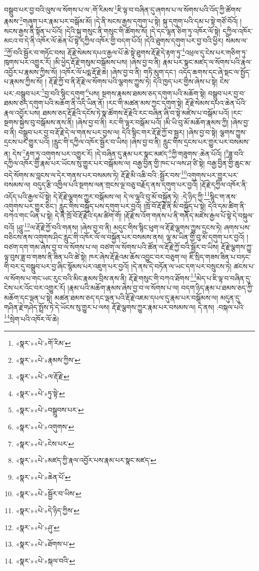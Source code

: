བསྒྲུབ་པར་བྱ་བའི་ལུས་ལ་སོགས་པ་ལ་:གོ་རིམས་\footnote{«སྣར་»«པེ་»གོ་རིམ་}ཇི་ལྟ་བ་བཞིན་དུ་ཞགས་པ་ལ་སོགས་པའི་འོད་ཀྱི་ཚོགས་རྣམས་\footnote{«སྣར་»«པེ་»རྣམས་ཀྱིས་}གཞུག་པར་རྣམ་པར་བསྒོམ་མོ། །དེ་ནི་སངས་རྒྱས་དགུག་པ་སྟེ། སྐུ་དགུག་པའི་དམ་པ་སྟེ་གཙོ་བོའོ། །སངས་རྒྱས་ནི་སྟོན་པ་པོའོ། །དེའི་སྐུ་གསུང་ནི་གསུང་གི་ཚོགས་སོ། །དེ་དང་ལྷན་ཅིག་ཏུ་འཁོར་ལོ་སྟེ། དཀྱིལ་འཁོར་མངའ་བ་དེ་ནི་འཁོར་ལོ་ཆེན་པོ་སྟེ་དཀྱིལ་འཁོར་གྱི་བདག་པོའོ། །དེའི་ཐུགས་དགུག་པར་བྱ་བའི་ཕྱིར། སེམས་ལ་\footnote{«སྣར་»«པེ་»ལ་རྡོ་རྗེ་}ཀྱོ་བའི་སྦྱོར་བ་གཏོང་བས། རྡོ་རྗེ་སེམས་དཔའ་རྒྱལ་པོ་ཆེ་སྟེ་ཐུགས་རྡོ་རྗེ་དེ་རྟག་ཏུ་\footnote{«སྣར་»«པེ་»ཏུ་སྟེ་}འཕྲལ་དུ་ངེས་པར་གཅིག་ཏུ་ཁུགས་པར་འགྱུར་རོ། །མི་ཕྱེད་རྡོ་རྗེ་གསུམ་བསྒོམས་པས། །ཞེས་བྱ་བ་ནི། རྣམ་པར་སྣང་མཛད་ལ་སོགས་པའི་རྣལ་འབྱོར་པ་རྣམས་ཀྱིས་སོ། །འཁོར་ལོ་པདྨ་རྡོ་རྗེ་ཆེ། །ཞེས་བྱ་བ་ནི། གཏི་མུག་དང་། འདོད་ཆགས་དང་ཞེ་སྡང་ལ་སྤྱོད་པ་རྣམས་ཀྱིས་སོ། །
རྡོ་རྗེ་ཀྱོ་བ་ནི་རྡོ་རྗེ་ལ་སོགས་པའི་ལྕགས་ཀྱུས་ཏེ། དེའི་ཁྱད་པར་གྱིས་ཞེས་པ་སྟེ། ངེས་པར་:བསྒྲུབ་པར་\footnote{«སྣར་»«པེ་»བསྒྲུབས་པར་}བྱ་བའི་སྙིང་དགུག་\footnote{«སྣར་»«པེ་»འགུགས་}པས། སྔགས་རྣམས་ཐམས་ཅད་དགུག་པའི་མཆོག་སྟེ། བསྒྲུབ་པར་བྱ་བ་ཐམས་ཅད་དགུག་པའི་མཆོག་ནི་འདི་ཡིན་ནོ། །རང་གི་མཚན་མས་ཀྱང་དགུག་སྟེ། རྡོ་རྗེ་སེམས་དཔའ་ཆེན་པོའི་རྣལ་འབྱོར་པས། ཐམས་ཅད་རྡོ་རྗེའི་དངོས་ཏེ་སྣ་ཚོགས་རྡོ་རྗེའི་རང་བཞིན་ཞི་བ་སྟེ་མཛེས་པ་བསྒོམ་པའོ། །རང་སྔགས་སྐྱེས་བུ་བསྒོམས་ནས་ནི། །ཞེས་བྱ་བ་ནི། རང་གི་ལྷར་བསྒོམ་པའོ། །མི་ཡི་བུ་མོ་མཆོག་རྣམས་ཀྱི། །ཞེས་བྱ་བ་ནི། བསྒྲུབ་པར་བྱ་བ་རྡོ་རྗེ་དེ་ལ་གནས་པར་བྱས་ལ། དེའི་སྙིང་གར་རྡོ་རྗེ་ཀྱོ་བ་སྦྱར། །ཞེས་བྱ་བ་སྟེ། ལྕགས་ཀྱུས་དྲངས་པར་གྱུར་པའོ། །རླུང་གི་དཀྱིལ་འཁོར་སྦྱོར་བ་ཡིས། །ཞེས་བྱ་བ་ནི། རླུང་གིས་དྲངས་པར་གྱུར་པར་བསམས་ན། དེས་\footnote{«སྣར་»«པེ་»ངེས་པར་}རྟག་ཏུ་འགུགས་པར་འགྱུར་རོ། །དེ་བཞིན་དུ་རྣམ་པར་སྣང་མཛད་\footnote{«སྣར་»«པེ་»མཛད་ཀྱི་རྣལ་འབྱོར་པས་རྣམ་པར་སྣང་མཛད་}ཀྱི་གཟུགས་:ཆེན་པོའོ། །\footnote{«སྣར་»«པེ་»ཆེན་པོ་}ཟླ་བའི་དཀྱིལ་འཁོར་གྱི་རྣམ་པར་ཡོངས་སུ་གྱུར་པར་བསྒོམས་ལ། བརྒྱ་བྱིན་གྱི་ཁང་པ་ལས་ཤ་ཙི་སྟེ། བརྒྱ་བྱིན་གྱི་ཆུང་མ་བདེ་སོགས་མ་བླངས་ལ་དེར་གནས་པར་བསམས་ཏེ། རྡོ་རྗེ་མི་འཆི་བའི་:སྦྱོར་བས་\footnote{«སྣར་»«པེ་»སྦྱོར་བ་ཡིས་}འགུགས་པར་གྱུར་པར་བསམས་ལ། བདུད་རྩི་འཁྱིལ་པའི་སྔགས་ལན་གྲངས་ལྔ་བཅུ་བརྗོད་ནས་དགུག་པར་བྱའོ། །རྡོ་རྗེ་དཀྱིལ་འཁོར་ནི་འདོད་པའི་རྒྱལ་པོ་སྟེ། དེ་རྡོ་རྗེ་ལྕགས་ཀྱུར་བསྒོམས་ལ། དེ་ལ་ལྷའི་བུ་མོ་བསྐྱོན་ཏེ། :དེ་ཉིད་ཀྱི་\footnote{«སྣར་»«པེ་»དེ་ཉིད་ཀྱིས་}སྙིང་ག་ནས་འགུགས་པར་གྱུར་ཅིང་། རླུང་གིས་བསྐྱོད་པས་དགུག་པར་བྱའོ། །ཁྲོ་བོ་རྡོ་རྗེ་ནི་མི་བསྐྱོད་པ་སྟེ། དེའི་དམ་ཚིག་ནི་བཀའ་གང་ཡིན་པ་སྟེ། དེ་ནི་ཁྲོ་བོ་རྡོ་རྗེའི་དམ་ཚིག་གོ། །རྡོ་རྗེ་ས་འོག་གནས་པ་ནི་གནོད་མཛེས་རྒྱལ་པོ་སྟེ་དེ་བསྐུལ་བའོ། །ཤཱུ་\footnote{«སྣར་»«པེ་»ཤུ་}ལ་རྡོ་རྗེ་ཀྱོ་བའི་གནས། །ཞེས་བྱ་བ་ནི། མདུང་གིས་སྙིང་ཕུག་ལ་རྡོ་རྗེ་ལྕགས་ཀྱུས་དྲངས་ཏེ། ཞགས་པས་བཅིངས་ནས་འགུགས་ཤིང་རླུང་གི་འཁོར་ལོ་ལ་བསྐྱོན་པར་བསམས་ནས། ལྷ་མ་ཡིན་གྱི་བུ་མོ་དགུག་པར་བྱའོ། །བཙག་དག་གམ་ཞེས་བྱ་བ་ལ་སོགས་པ་ལ། བཙག་ལ་སོགས་པའི་ཚོན་ལ་རྡོ་རྗེ་ཀྱོ་བའི་སྦྱོར་བ་ཡིས། རྡོ་རྗེ་ལྕགས་ཀྱུ་ལྟ་བུས་ཟླ་བ་གཟས་ནི་ཟིན་པའི་ཚེ་སྟེ། ཁར་ཞེས་རྡོ་རྗེའམ་ཆོས་འབྱུང་བར་བཅུག་ལ། ཇི་སྲིད་གཟས་ཟིན་པ་བཏང་གི་བར་དུ་བསྒྲུབ་པར་བྱ་ཞིང་སྙོམས་པར་འཇུག་པར་བྱའོ། །དེ་ནས་དེ་བཏོན་ལ་ཡང་དག་པར་བསྲུངས་ཏེ། ཚངས་པ་ལ་སོགས་པ་གང་ཡང་རུང་བའི་མིང་རྣམས་བྲིས་ནས་ནི། རྡོ་རྗེ་གསུང་གི་བཀའ་ཐོགས་\footnote{«སྣར་»«པེ་»ཐོགས་པ་}མེད་པ་ཇི་ལྟ་བ་བཞིན་དུ་ངེས་པར་འོང་བར་འགྱུར་རོ། །རྣམ་པའི་མཆོག་རྣམས་ཞེས་བྱ་བ་ལ་སོགས་པ་ལ། བདག་ཉིད་རྣམ་པ་ཐམས་ཅད་ཀྱི་མཆོག་དང་ལྡན་པ་སྟེ། མཚན་ཐམས་ཅད་དང་ལྡན་པའི་རྡོ་རྗེ་འཇམ་དཔལ་དུ་རྣམ་པར་བསྒོམས་ལ། མདུན་དུ་གཤིན་རྗེ་གཤེད་སྤྲོས་ཏེ་དེ་ཡོངས་སུ་གྱུར་པ་ལས། རྡོ་རྗེ་ལྕགས་ཀྱུར་རྣམ་པར་བསམས་ལ། དེ་ནས། :བསྐལ་པའི་\footnote{«སྣར་»«པེ་»སྐལ་བའི་}སྲེག་པའི་འཁོར་ལོ་ཆེ། 